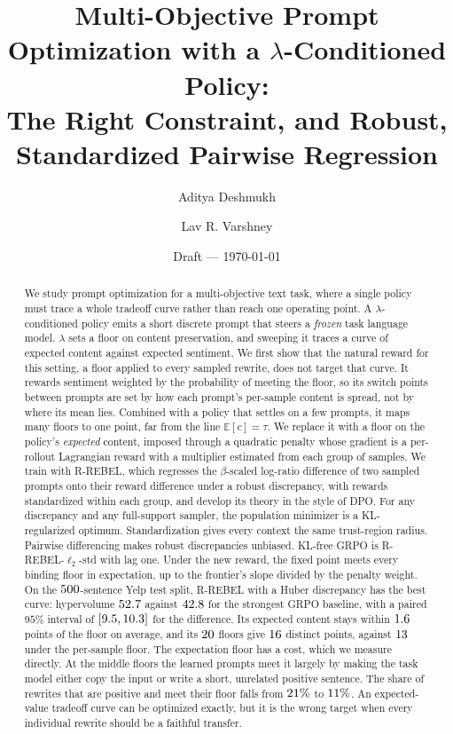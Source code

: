 \documentclass[11pt]{article}
\title{Multi-Objective Prompt Optimization with a $\lambda$-Conditioned Policy:\\
       The Right Constraint, and Robust, Standardized Pairwise Regression}
\author{Aditya Deshmukh \and Lav R. Varshney}
\date{Draft --- \today}
\theoremstyle{plain}
\newcommand{\lmb}{\lambda}
\newcommand{\rrebel}{\mbox{R-REBEL}}          %
\begin{document}
\maketitle

\begin{abstract}
We study prompt optimization for a multi-objective text task, where a single
policy must trace a whole tradeoff curve rather than reach one operating point.
A $\lmb$-conditioned policy emits a short discrete prompt that steers a
\emph{frozen} task language model. $\lmb$ sets a floor on content
preservation, and sweeping it traces a curve of expected content against
expected sentiment. We first show that the natural reward for this setting, a
floor applied to every sampled rewrite, does not target that curve. It rewards
sentiment weighted by the probability of meeting the floor, so its switch
points between prompts are set by how each prompt's per-sample content is
spread, not by where its mean lies. Combined with a policy that settles on a few
prompts, it maps many floors to one point, far from the line
$\mathbb{E}[c] = \tau$. We replace it with a floor on the policy's
\emph{expected} content, imposed through a quadratic penalty whose gradient is a
per-rollout Lagrangian reward with a multiplier estimated from each group of
samples. We train with \rrebel{}, which regresses the $\beta$-scaled log-ratio
difference of two sampled prompts onto their reward difference under a robust
discrepancy, with rewards standardized within each group, and develop its
theory in the style of DPO. For any discrepancy and any full-support sampler,
the population minimizer is a KL-regularized optimum. Standardization gives
every context the same trust-region radius. Pairwise differencing makes robust
discrepancies unbiased. KL-free GRPO is \rrebel{}-$\ell_2$-std with lag one.
Under the new reward, the fixed point meets every binding floor in expectation,
up to the frontier's slope divided by the penalty weight. On the
$500$-sentence Yelp test split, \rrebel{} with a Huber discrepancy has the
best curve: hypervolume $52.7$ against $42.8$ for the strongest GRPO
baseline, with a paired $95\%$ interval of $[9.5,
10.3]$ for the difference. Its expected content stays within
$1.6$ points of the floor on average, and its $20$ floors give
$16$ distinct points, against $13$ under the
per-sample floor. The expectation floor has a cost, which we measure directly.
At the middle floors the learned prompts meet it largely by making the task
model either copy the input or write a short, unrelated positive sentence.
The share of rewrites that are positive and meet their floor falls from
$21\%$ to $11\%$. An expected-value tradeoff
curve can be optimized exactly, but it is the wrong target when every
individual rewrite should be a faithful transfer.
\end{abstract}
\end{document}
